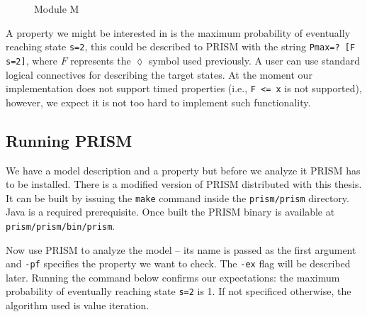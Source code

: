 \begin{figure}
\caption{Module M}
\label{moduleM}
\end{figure}

A property we might be interested in is the maximum probability of
eventually reaching state \verb|s=2|, this could be described to PRISM
with the string \verb|Pmax=? [F s=2]|, where $F$ represents the
$\lozenge$ symbol used previously. A user can use standard logical
connectives for describing the target states. At the moment our
implementation does not support timed properties (i.e., \verb|F <= x| is not
supported), however, we expect it is not too hard to implement such
functionality.

\subsection*{Running PRISM}

We have a model description and a property but before we analyze it
PRISM has to be installed.
There is a modified version of PRISM distributed with this thesis. It
can be built by issuing the \verb|make| command inside the
\verb|prism/prism| directory. Java is a required prerequisite.
Once built the PRISM binary is available at \verb|prism/prism/bin/prism|.

Now use PRISM to analyze the model -- its name is passed as the first
argument and \verb|-pf| specifies the property we want to check.
The \verb|-ex| flag will be described later.
Running the command below
confirms our expectations: the maximum probability of eventually
reaching state \verb|s=2| is 1. If not specificed otherwise, the
algorithm used is value iteration.

